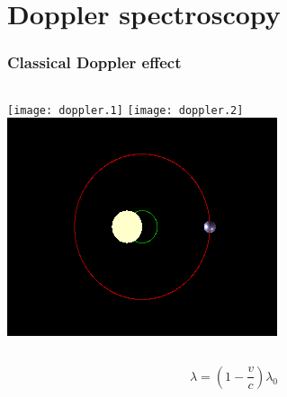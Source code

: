 \documentclass[aspectratio=169]{beamer}
\begin{document}
\section{Doppler spectroscopy}
\begin{frame}
\frametitle{Classical Doppler effect}
\begin{columns}
\texttt{[image: doppler.1]}
\vspace{0.5cm}
\texttt{[image: doppler.2]}
\includegraphics[width=\textwidth]{img/Dopplerspectr-above.png}
\end{columns}
\begin{displaymath}
\lambda = \left(1 - \frac{v}{c}\right) \lambda_0
\end{displaymath}

\end{frame}
\end{document}
